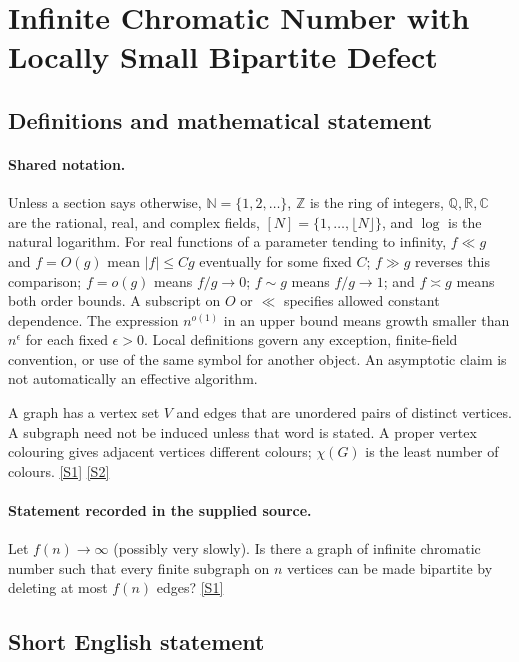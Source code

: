 \documentclass[11pt,a4paper]{article}
\newcommand{\N}{\mathbb{N}}
\newcommand{\Z}{\mathbb{Z}}
\newcommand{\Q}{\mathbb{Q}}
\newcommand{\R}{\mathbb{R}}
\newcommand{\C}{\mathbb{C}}
\newcommand{\sref}[2]{\hyperlink{source:#1:#2}{[S#2]}}
\begin{document}
\section{Infinite Chromatic Number with Locally Small Bipartite Defect}\label{statement}


\subsection{Definitions and mathematical statement}

\paragraph{Shared notation.}Unless a section says otherwise, $\N=\{1,2,\ldots\}$,
$\Z$ is the ring of integers, $\Q,\R,\C$ are the rational, real, and complex
fields, $[N]=\{1,\ldots,\lfloor N\rfloor\}$, and $\log$ is the natural
logarithm. For real functions of a parameter tending to infinity,
$f\ll g$ and $f=O(g)$ mean $|f|\leq Cg$ eventually for some fixed $C$;
$f\gg g$ reverses this comparison; $f=o(g)$ means $f/g\to0$;
$f\sim g$ means $f/g\to1$; and $f\asymp g$ means both order bounds.
A subscript on $O$ or $\ll$ specifies allowed constant dependence.
The expression $n^{o(1)}$ in an upper bound means growth smaller than
$n^\epsilon$ for each fixed $\epsilon>0$. Local definitions govern any
exception, finite-field convention, or use of the same symbol for another
object. An asymptotic claim is not automatically an effective algorithm.



A graph has a vertex set $V$ and edges that are unordered pairs of distinct vertices. A subgraph need not be induced unless that word is stated. A proper vertex colouring gives adjacent vertices different colours; $\chi(G)$ is the least number of colours. \sref{statement}{1} \sref{statement}{2}

\paragraph{Statement recorded in the supplied source.}
Let $f(n)\to \infty$ (possibly very slowly). Is there a graph of infinite chromatic number such that every finite subgraph on $n$ vertices can be made bipartite by deleting at most $f(n)$ edges? \sref{statement}{1}

\subsection{Short English statement}
\end{document}
